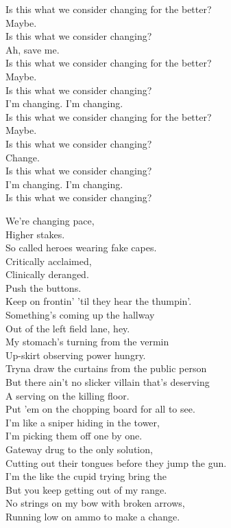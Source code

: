 Is this what we consider changing for the better? \\
Maybe. \\
Is this what we consider changing? \\
Ah, save me. \\
Is this what we consider changing for the better? \\
Maybe. \\
Is this what we consider changing? \\
I'm changing. I'm changing. \\
Is this what we consider changing for the better? \\
Maybe. \\
Is this what we consider changing? \\
Change. \\
Is this what we consider changing? \\
I'm changing. I'm changing. \\
Is this what we consider changing? \\


We're changing pace, \\
Higher stakes. \\
So called heroes wearing fake capes. \\
Critically acclaimed, \\
Clinically deranged. \\
Push the buttons. \\
Keep on frontin' 'til they hear the thumpin'. \\
Something's coming up the hallway \\
Out of the left field lane, hey. \\
My stomach's turning from the vermin \\
Up-skirt observing power hungry. \\
Tryna draw the curtains from the public person \\
But there ain't no slicker villain that's deserving \\
A serving on the killing floor. \\
Put 'em on the chopping board for all to see. \\

I'm like a sniper hiding in the tower, \\
I'm picking them off one by one. \\
Gateway drug to the only solution, \\
Cutting out their tongues before they jump the gun. \\
I'm the like the cupid trying bring the  \\
But you keep getting out of my range. \\
No strings on my bow with broken arrows, \\
Running low on ammo to make a change. \\

